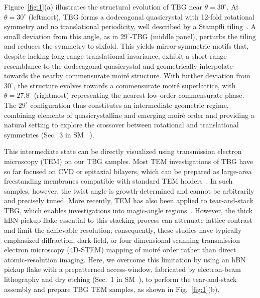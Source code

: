 \documentclass[reprint,
superscriptaddress,amsmath,amssymb,aps,prl]{revtex4-2}
\begin{document}
Figure~\ref{fig:1}(a) illustrates the structural evolution of TBG near $\theta = 30^\circ$. At $\theta = 30^\circ$ (leftmost), TBG forms a dodecagonal quasicrystal with 12-fold rotational symmetry and no translational periodicity, well described by a Stampfli tiling~\cite{stampfli1986dodecagonal, ahn2018dirac}. A small deviation from this angle, as in $29^\circ$-TBG (middle panel), perturbs the tiling and reduces the symmetry to sixfold. This yields mirror-symmetric motifs that, despite lacking long-range translational invariance, exhibit a short-range resemblance to the dodecagonal quasicrystal and geometrically interpolate towards the nearby commensurate moir\'{e} structure. With further deviation from $30^\circ$, the structure evolves towards a commensurate moir\'{e} superlattice, with $\theta = 27.8^\circ$ (rightmost) representing the nearest low-order commensurate phase. The $29^\circ$ configuration thus constitutes an intermediate geometric regime, combining elements of quasicrystalline and emerging moir\'{e} order and providing a natural setting to explore the crossover between rotational and translational symmetries (Sec.~3 in SM ~\cite{SI}).


This intermediate state can be directly visualized using transmission electron microscopy (TEM) on our TBG samples. Most TEM investigations of TBG have so far focused on CVD or epitaxial bilayers, which can be prepared as large-area freestanding membranes compatible with standard TEM holders~\cite{ahn2018dirac, tsang2024polar}. In such samples, however, the twist angle is growth-determined and cannot be arbitrarily and precisely tuned. More recently, TEM has also been applied to tear-and-stack TBG, which enables investigations into magic-angle regions~\cite{yoo2019atomic, kazmierczak2021strain, li2025robust}. However, the thick hBN pickup flake essential to this stacking process can attenuate lattice contrast and limit the achievable resolution; consequently, these studies have typically emphasized diffraction, dark-field, or four dimensional scanning transmission electron microscopy (4D-STEM) mapping of moir\'{e} order rather than direct atomic-resolution imaging. Here, we overcome this limitation by using an hBN pickup flake with a prepatterned access-window, fabricated by electron-beam lithography and dry etching (Sec.~1 in SM~\cite{SI}), to perform the tear-and-stack assembly and prepare TBG TEM samples, as shown in Fig.~\ref{fig:1}(b).
\end{document}
